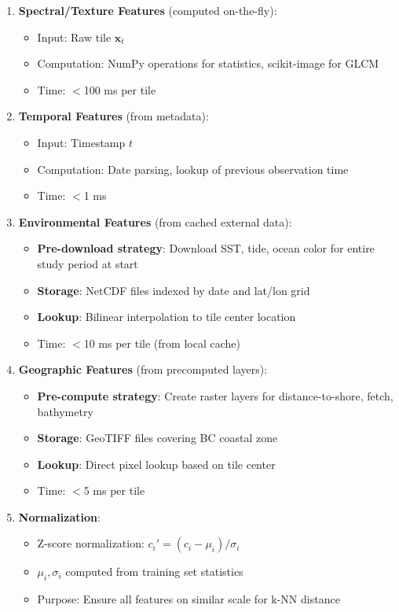 \documentclass[11pt]{article}
\begin{document}
\begin{enumerate}
    \item \textbf{Spectral/Texture Features} (computed on-the-fly):
    \begin{itemize}
        \item Input: Raw tile $\mathbf{x}_t$
        \item Computation: NumPy operations for statistics, scikit-image for GLCM
        \item Time: $<$100 ms per tile
    \end{itemize}

    \item \textbf{Temporal Features} (from metadata):
    \begin{itemize}
        \item Input: Timestamp $t$
        \item Computation: Date parsing, lookup of previous observation time
        \item Time: $<$1 ms
    \end{itemize}

    \item \textbf{Environmental Features} (from cached external data):
    \begin{itemize}
        \item \textbf{Pre-download strategy}: Download SST, tide, ocean color for entire study period at start
        \item \textbf{Storage}: NetCDF files indexed by date and lat/lon grid
        \item \textbf{Lookup}: Bilinear interpolation to tile center location
        \item Time: $<$10 ms per tile (from local cache)
    \end{itemize}

    \item \textbf{Geographic Features} (from precomputed layers):
    \begin{itemize}
        \item \textbf{Pre-compute strategy}: Create raster layers for distance-to-shore, fetch, bathymetry
        \item \textbf{Storage}: GeoTIFF files covering BC coastal zone
        \item \textbf{Lookup}: Direct pixel lookup based on tile center
        \item Time: $<$5 ms per tile
    \end{itemize}

    \item \textbf{Normalization}:
    \begin{itemize}
        \item Z-score normalization: $c_i' = (c_i - \mu_i) / \sigma_i$
        \item $\mu_i, \sigma_i$ computed from training set statistics
        \item Purpose: Ensure all features on similar scale for k-NN distance
    \end{itemize}
\end{enumerate}
\end{document}
